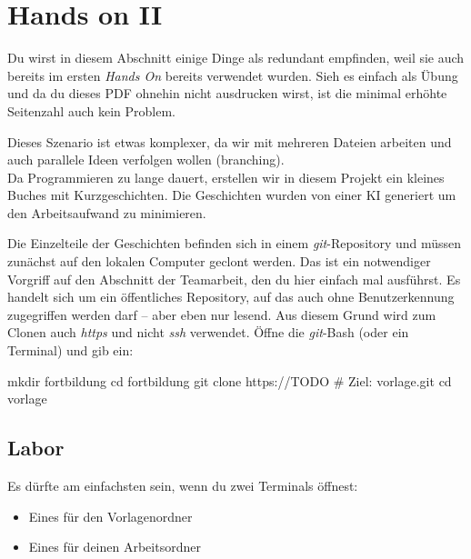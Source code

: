 \documentclass[
  letterpaper,
  DIV=11]{scrreprt}
\newenvironment{Shaded}{\begin{snugshade}}{\end{snugshade}}
\newcommand{\BuiltInTok}[1]{\textcolor[rgb]{0.00,0.23,0.31}{#1}}
\newcommand{\CommentTok}[1]{\textcolor[rgb]{0.37,0.37,0.37}{#1}}
\newcommand{\FunctionTok}[1]{\textcolor[rgb]{0.28,0.35,0.67}{#1}}
\newcommand{\NormalTok}[1]{\textcolor[rgb]{0.00,0.23,0.31}{#1}}
\providecommand{\tightlist}{%
  \setlength{\itemsep}{0pt}\setlength{\parskip}{0pt}}\usepackage{longtable,booktabs,array}
\newcommand{\git}{\textit{git}\xspace}
\begin{document}
\chapter{Hands on II}\label{hands-on-ii}

Du wirst in diesem Abschnitt einige Dinge als redundant empfinden, weil
sie auch bereits im ersten \emph{Hands On} bereits verwendet wurden.
Sieh es einfach als Übung und da du dieses PDF ohnehin nicht ausdrucken
wirst, ist die minimal erhöhte Seitenzahl auch kein Problem.

Dieses Szenario ist etwas komplexer, da wir mit mehreren Dateien
arbeiten und auch parallele Ideen verfolgen wollen (branching).\\
Da Programmieren zu lange dauert, erstellen wir in diesem Projekt ein
kleines Buches mit Kurzgeschichten. Die Geschichten wurden von einer KI
generiert um den Arbeitsaufwand zu minimieren.

Die Einzelteile der Geschichten befinden sich in einem \git-Repository
und müssen zunächst auf den lokalen Computer geclont werden. Das ist ein
notwendiger Vorgriff auf den Abschnitt der Teamarbeit, den du hier
einfach mal ausführst. Es handelt sich um ein öffentliches Repository,
auf das auch ohne Benutzerkennung zugegriffen werden darf -- aber eben
nur lesend. Aus diesem Grund wird zum Clonen auch \emph{https} und nicht
\emph{ssh} verwendet. Öffne die \git-Bash (oder ein Terminal) und gib
ein:

\begin{Shaded}
\begin{Highlighting}[]
\FunctionTok{mkdir}\NormalTok{ fortbildung}
\BuiltInTok{cd}\NormalTok{ fortbildung}
\FunctionTok{git}\NormalTok{ clone https://TODO }\CommentTok{\# Ziel: vorlage.git }
\BuiltInTok{cd}\NormalTok{ vorlage}
\end{Highlighting}
\end{Shaded}

\section{Labor}\label{labor}

Es dürfte am einfachsten sein, wenn du zwei Terminals öffnest:

\begin{itemize}
\tightlist
\item
  Eines für den Vorlagenordner
\item
  Eines für deinen Arbeitsordner
\end{itemize}
\end{document}
